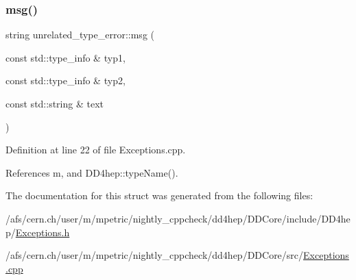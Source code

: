 \subsubsection{\texorpdfstring{msg()}{msg()}}
{\footnotesize\ttfamily string unrelated\+\_\+type\+\_\+error\+::msg (\begin{DoxyParamCaption}\item[{const std\+::type\+\_\+info \&}]{typ1,  }\item[{const std\+::type\+\_\+info \&}]{typ2,  }\item[{const std\+::string \&}]{text }\end{DoxyParamCaption})\hspace{0.3cm}{\ttfamily [static]}}



Definition at line 22 of file Exceptions.\+cpp.



References m, and D\+D4hep\+::type\+Name().



The documentation for this struct was generated from the following files\+:\begin{DoxyCompactItemize}
\item 
/afs/cern.\+ch/user/m/mpetric/nightly\+\_\+cppcheck/dd4hep/\+D\+D\+Core/include/\+D\+D4hep/\hyperlink{_d_d_core_2include_2_d_d4hep_2_exceptions_8h}{Exceptions.\+h}\item 
/afs/cern.\+ch/user/m/mpetric/nightly\+\_\+cppcheck/dd4hep/\+D\+D\+Core/src/\hyperlink{_exceptions_8cpp}{Exceptions.\+cpp}\end{DoxyCompactItemize}
